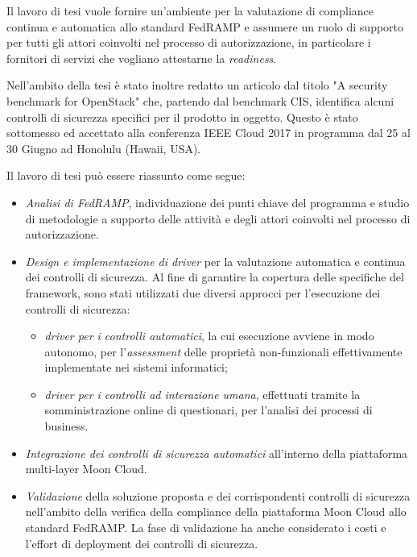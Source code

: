 \documentclass[../main.tex]{subfiles}
\begin{document}
Il lavoro di tesi vuole fornire un'ambiente per la valutazione di compliance continua e automatica allo standard FedRAMP e assumere un ruolo di supporto per tutti gli attori coinvolti nel processo di autorizzazione, in particolare i fornitori di servizi che vogliano attestarne la \textit{readiness}.


Nell'ambito della tesi è stato inoltre redatto un articolo dal titolo "A security benchmark for OpenStack" che, partendo dal benchmark CIS, identifica alcuni controlli di sicurezza specifici per il prodotto in oggetto.
Questo è stato sottomesso ed accettato alla conferenza IEEE Cloud 2017 in programma dal 25 al 30 Giugno  ad Honolulu (Hawaii, USA).


Il lavoro di tesi può essere riassunto come segue:
\begin{itemize}
\item \textit{Analisi di FedRAMP}, individuazione dei punti chiave del programma e studio di metodologie a supporto delle attività e degli attori coinvolti nel processo di autorizzazione.
\item \textit{Design e implementazione di driver} per la valutazione automatica e continua dei controlli di sicurezza.
Al fine di garantire la copertura delle specifiche del framework, sono stati utilizzati due diversi approcci per l'esecuzione dei controlli di sicurezza:
\begin{itemize}
\item \textit{driver per i controlli automatici}, la cui esecuzione avviene in modo autonomo, per l'\textit{assessment} delle proprietà non-funzionali effettivamente implementate nei sistemi informatici;
\item \textit{driver per i controlli ad interazione umana}, effettuati tramite la somministrazione online di questionari, per l'analisi dei processi di business.
\end{itemize}
\item \textit{Integrazione dei controlli di sicurezza automatici} all'interno della piattaforma multi-layer Moon Cloud.
\item \textit{Validazione} della soluzione proposta e dei corrispondenti controlli di sicurezza nell'ambito della verifica della compliance della piattaforma Moon Cloud allo standard FedRAMP. La fase di validazione ha anche considerato i costi e l'effort di deployment dei controlli di sicurezza.
\end{itemize}
\end{document}
